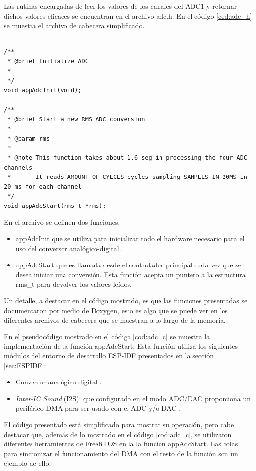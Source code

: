 Las rutinas encargadas de leer los valores de los canales del ADC1 y retornar dichos valores eficaces se encuentran en el archivo adc.h. En el código \ref{cod:adc_h} se muestra el archivo de cabecera simplificado. 

\begin{lstlisting}[label=cod:adc_h,caption=Pseudocódigo del módulo adc.h.] % Start your code-block

/**
 * @brief Initialize ADC 
 * 
 */
void appAdcInit(void);

/**
 * @brief Start a new RMS ADC conversion
 * 
 * @param rms
 *
 * @note This function takes about 1.6 seg in processing the four ADC channels
 *       It reads AMOUNT_OF_CYLCES cycles sampling SAMPLES_IN_20MS in 20 ms for each channel
 */
void appAdcStart(rms_t *rms);

\end{lstlisting}

En el archivo se definen dos funciones:
\begin{itemize}
\item appAdcInit que se utiliza para inicializar todo el hardware necesario para el uso del conversor analógico-digital.
\item appAdcStart que es llamada desde el controlador principal cada vez que se desea iniciar una conversión. Esta función acepta un puntero a la estructura rms\_t para devolver los valores leídos. 
\end{itemize}

Un detalle, a destacar en el código mostrado, es que las funciones presentadas se documentaron por medio de Doxygen, esto es algo que se puede ver en los diferentes archivos de cabecera que se muestran a lo largo de la memoria.

En el pseudocódigo mostrado en el código \ref{cod:adc_c} se muestra la implementación de la función appAdcStart. Esta función utiliza los siguientes módulos del entorno de desarrollo ESP-IDF presentados en la sección \ref{sec:ESPIDF}: 
\begin{itemize}
\item Conversor analógico-digital \citep{ADC}.
\item \textit{Inter-IC Sound} (I2S): que configurado en el modo ADC/DAC proporciona un periférico DMA para ser usado con el ADC y/o DAC \citep{I2S}.
\end{itemize}

El código presentado está simplificado para mostrar su operación, pero cabe destacar que, además de lo mostrado en el código \ref{cod:adc_c}, se utilizaron diferentes herramientas de FreeRTOS en la la función appAdcStart. Las colas para sincronizar el funcionamiento del DMA con el resto de la función son un ejemplo de ello.

